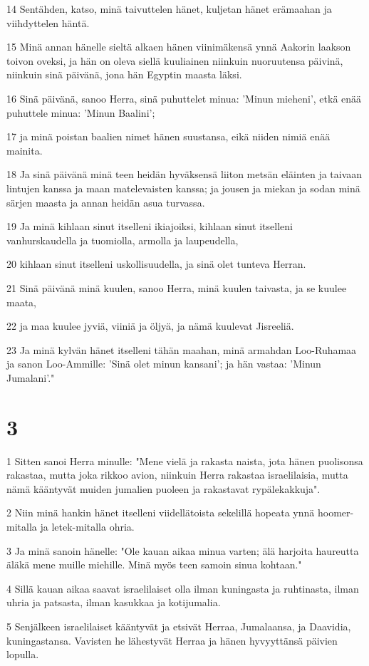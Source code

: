 \par 14 Sentähden, katso, minä taivuttelen hänet, kuljetan hänet erämaahan ja viihdyttelen häntä.
\par 15 Minä annan hänelle sieltä alkaen hänen viinimäkensä ynnä Aakorin laakson toivon oveksi, ja hän on oleva siellä kuuliainen niinkuin nuoruutensa päivinä, niinkuin sinä päivänä, jona hän Egyptin maasta läksi.
\par 16 Sinä päivänä, sanoo Herra, sinä puhuttelet minua: 'Minun mieheni', etkä enää puhuttele minua: 'Minun Baalini';
\par 17 ja minä poistan baalien nimet hänen suustansa, eikä niiden nimiä enää mainita.
\par 18 Ja sinä päivänä minä teen heidän hyväksensä liiton metsän eläinten ja taivaan lintujen kanssa ja maan matelevaisten kanssa; ja jousen ja miekan ja sodan minä särjen maasta ja annan heidän asua turvassa.
\par 19 Ja minä kihlaan sinut itselleni ikiajoiksi, kihlaan sinut itselleni vanhurskaudella ja tuomiolla, armolla ja laupeudella,
\par 20 kihlaan sinut itselleni uskollisuudella, ja sinä olet tunteva Herran.
\par 21 Sinä päivänä minä kuulen, sanoo Herra, minä kuulen taivasta, ja se kuulee maata,
\par 22 ja maa kuulee jyviä, viiniä ja öljyä, ja nämä kuulevat Jisreeliä.
\par 23 Ja minä kylvän hänet itselleni tähän maahan, minä armahdan Loo-Ruhamaa ja sanon Loo-Ammille: 'Sinä olet minun kansani'; ja hän vastaa: 'Minun Jumalani'."

\chapter{3}

\par 1 Sitten sanoi Herra minulle: "Mene vielä ja rakasta naista, jota hänen puolisonsa rakastaa, mutta joka rikkoo avion, niinkuin Herra rakastaa israelilaisia, mutta nämä kääntyvät muiden jumalien puoleen ja rakastavat rypälekakkuja".
\par 2 Niin minä hankin hänet itselleni viidellätoista sekelillä hopeata ynnä hoomer-mitalla ja letek-mitalla ohria.
\par 3 Ja minä sanoin hänelle: "Ole kauan aikaa minua varten; älä harjoita haureutta äläkä mene muille miehille. Minä myös teen samoin sinua kohtaan."
\par 4 Sillä kauan aikaa saavat israelilaiset olla ilman kuningasta ja ruhtinasta, ilman uhria ja patsasta, ilman kasukkaa ja kotijumalia.
\par 5 Senjälkeen israelilaiset kääntyvät ja etsivät Herraa, Jumalaansa, ja Daavidia, kuningastansa. Vavisten he lähestyvät Herraa ja hänen hyvyyttänsä päivien lopulla.

